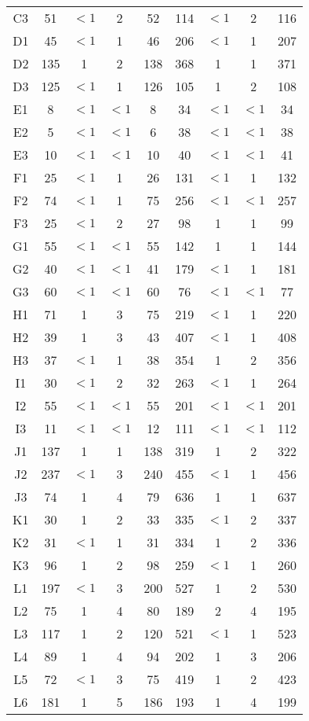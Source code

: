 \begin{center}
\begin{longtable}{ccccc|cccc}
C3&51&$<1$&2&52&114&$<1$&2&116\\
D1&45&$<1$&1&46&206&$<1$&1&207\\
D2&135&1&2&138&368&1&1&371\\
D3&125&$<1$&1&126&105&1&2&108\\
E1&8&$<1$&$<1$&8&34&$<1$&$<1$&34\\
E2&5&$<1$&$<1$&6&38&$<1$&$<1$&38\\
E3&10&$<1$&$<1$&10&40&$<1$&$<1$&41\\
F1&25&$<1$&1&26&131&$<1$&1&132\\
F2&74&$<1$&1&75&256&$<1$&$<1$&257\\
F3&25&$<1$&2&27&98&1&1&99\\
G1&55&$<1$&$<1$&55&142&1&1&144\\
G2&40&$<1$&$<1$&41&179&$<1$&1&181\\
G3&60&$<1$&$<1$&60&76&$<1$&$<1$&77\\
H1&71&1&3&75&219&$<1$&1&220\\
H2&39&1&3&43&407&$<1$&1&408\\
H3&37&$<1$&1&38&354&1&2&356\\
I1&30&$<1$&2&32&263&$<1$&1&264\\
I2&55&$<1$&$<1$&55&201&$<1$&$<1$&201\\
I3&11&$<1$&$<1$&12&111&$<1$&$<1$&112\\
J1&137&1&1&138&319&1&2&322\\
J2&237&$<1$&3&240&455&$<1$&1&456\\
J3&74&1&4&79&636&1&1&637\\
K1&30&1&2&33&335&$<1$&2&337\\
K2&31&$<1$&1&31&334&1&2&336\\
K3&96&1&2&98&259&$<1$&1&260\\
L1&197&$<1$&3&200&527&1&2&530\\
L2&75&1&4&80&189&2&4&195\\
L3&117&1&2&120&521&$<1$&1&523\\
L4&89&1&4&94&202&1&3&206\\
L5&72&$<1$&3&75&419&1&2&423\\
L6&181&1&5&186&193&1&4&199\\
\end{longtable}
\end{center}

